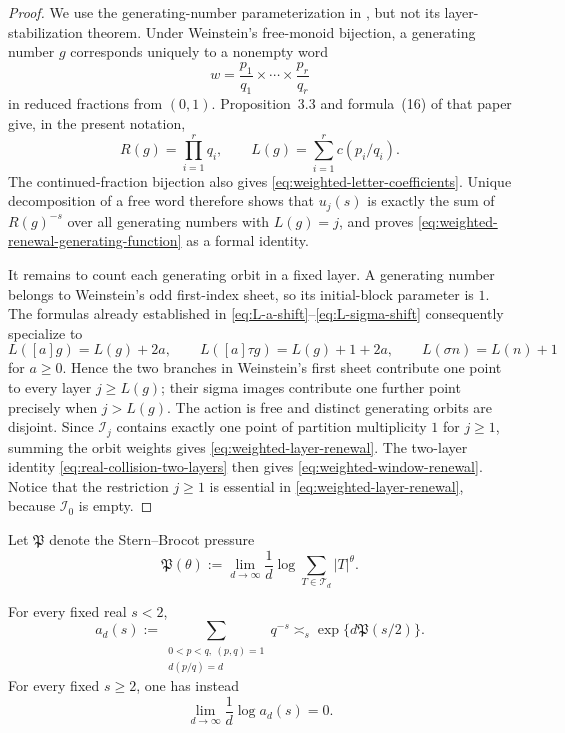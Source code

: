\begin{proof}
We use the generating-number parameterization in
\cite[Secs.~3--4]{Weinstein2016}, but not its layer-stabilization theorem.
Under Weinstein's free-monoid bijection, a generating number \(g\) corresponds
uniquely to a nonempty word
\[
 w=\frac{p_1}{q_1}\times\cdots\times\frac{p_r}{q_r}
\]
in reduced fractions from \((0,1)\).  Proposition~3.3 and formula~(16) of
that paper give, in the present notation,
\begin{equation}
 R(g)=\prod_{i=1}^r q_i,
 \qquad L(g)=\sum_{i=1}^r c(p_i/q_i).
 \label{eq:generator-weight-length}
\end{equation}
The continued-fraction bijection also gives
\eqref{eq:weighted-letter-coefficients}.  Unique decomposition of a free word
therefore shows that \(u_j(s)\) is exactly the sum of \(R(g)^{-s}\) over all
generating numbers with \(L(g)=j\), and proves
\eqref{eq:weighted-renewal-generating-function} as a formal identity.

It remains to count each generating orbit in a fixed layer.  A generating
number belongs to Weinstein's odd first-index sheet, so its initial-block
parameter is \(1\).  The formulas already established in
\eqref{eq:L-a-shift}--\eqref{eq:L-sigma-shift} consequently specialize to
\[
 L([a]g)=L(g)+2a,\qquad
 L([a]\tau g)=L(g)+1+2a,\qquad
 L(\sigma n)=L(n)+1
\]
for \(a\ge0\).  Hence the two branches in Weinstein's first sheet contribute
one point to every layer \(j\ge L(g)\); their sigma images contribute one
further point precisely when \(j>L(g)\).  The action is free and distinct
generating orbits are disjoint.  Since \(\mathcal I_j\) contains exactly one
point of partition multiplicity \(1\) for \(j\ge1\), summing the orbit weights
gives \eqref{eq:weighted-layer-renewal}.  The two-layer identity
\eqref{eq:real-collision-two-layers} then gives
\eqref{eq:weighted-window-renewal}.  Notice that the restriction \(j\ge1\) is
essential in \eqref{eq:weighted-layer-renewal}, because \(\mathcal I_0\) is
empty.
\end{proof}

Let \(\mathfrak P\) denote the Stern--Brocot pressure
\[
 \mathfrak P(\theta)
 :=\lim_{d\to\infty}\frac1d
   \log\sum_{T\in\mathcal T_d}|T|^\theta .
\]

\begin{lemma}
\label{lem:knauf-layer-estimate}
For every fixed real \(s<2\),
\begin{equation}
 a_d(s):=
 \sum_{\substack{0<p<q,\ (p,q)=1\\d(p/q)=d}}q^{-s}
 \asymp_s \exp\{d\mathfrak P(s/2)\}.
 \label{eq:knauf-layer-pressure}
\end{equation}
For every fixed \(s\ge2\), one has instead
\[
 \lim_{d\to\infty}\frac1d\log a_d(s)=0.
\]
\end{lemma}


